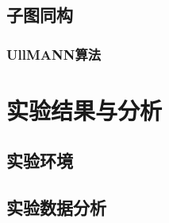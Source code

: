 \documentclass{XDBAthesis}
\numberwithin{algorithm}{chapter}
\begin{document}
\subsection{子图同构}
\subsubsection{UllMANN算法}


\section{实验结果与分析}
\subsection{实验环境}
\subsection{实验数据分析}


\ifx\allfiles\undefined


\end{document}
